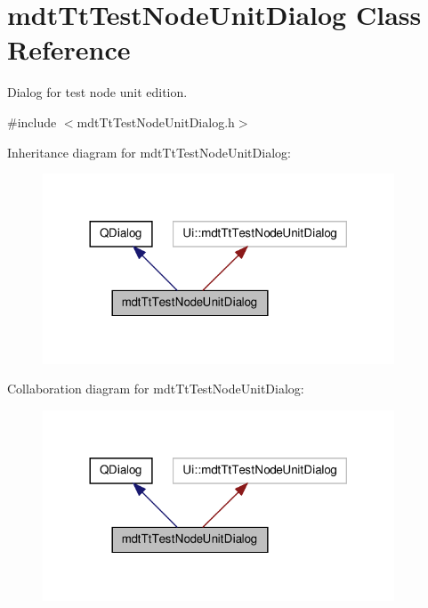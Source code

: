 \hypertarget{classmdt_tt_test_node_unit_dialog}{\section{mdt\-Tt\-Test\-Node\-Unit\-Dialog Class Reference}
\label{classmdt_tt_test_node_unit_dialog}
}


Dialog for test node unit edition.  




{\ttfamily \#include $<$mdt\-Tt\-Test\-Node\-Unit\-Dialog.\-h$>$}



Inheritance diagram for mdt\-Tt\-Test\-Node\-Unit\-Dialog\-:\nopagebreak
\begin{figure}[H]
\begin{center}
\leavevmode
\includegraphics[width=296pt]{classmdt_tt_test_node_unit_dialog__inherit__graph}
\end{center}
\end{figure}


Collaboration diagram for mdt\-Tt\-Test\-Node\-Unit\-Dialog\-:\nopagebreak
\begin{figure}[H]
\begin{center}
\leavevmode
\includegraphics[width=296pt]{classmdt_tt_test_node_unit_dialog__coll__graph}
\end{center}
\end{figure}
